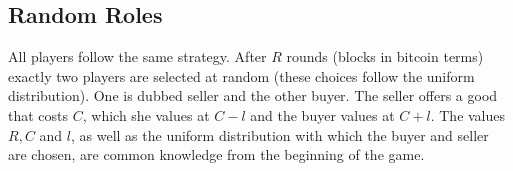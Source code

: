 \subsection{Random Roles}
  All players follow the same strategy. After $R$ rounds (blocks in bitcoin terms) exactly two players are selected at random
  (these choices follow the uniform distribution). One is dubbed seller and the other buyer. The seller offers a good that
  costs $C$, which she values at $C - l$ and the buyer values at $C + l$. The values $R, C$ and $l$, as well as the
  uniform distribution with which the buyer and seller are chosen, are common knowledge from the beginning of the game.
